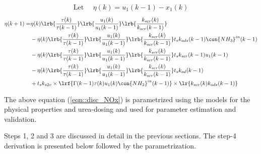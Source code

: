 \begin{enumerate}
\begin{align}
                        \text{Let }\quad \eta(k) = u_1(k-1) - x_1(k)
                \end{align}
\begin{align}
        \eta(k+1) =& \eta(k) \lrb{\frac{\tau(k)}{\tau(k-1)}}
                                \lrb{\frac{u_1(k)}{u_1(k-1)}}
                                \lrb{\frac{k_{scr}(k)}{k_{scr}(k-1)}} \notag \\
                &-\eta(k) \lrb{\frac{\tau(k)}{\tau(k-1)}}
                                \lrb{\frac{u_1(k)}{u_1(k-1)}}
                                \lrb{\frac{k_{scr}(k)}{k_{scr}(k-1)}}
                t_s k_{ads}(k-1) \con{NH_3}^{in}(k-1)
                \notag \\
                &-\eta(k) \lrb{\frac{\tau(k)}{\tau(k-1)}}
                                \lrb{\frac{u_1(k)}{u_1(k-1)}}
                                \lrb{\frac{k_{scr}(k)}{k_{scr}(k-1)}}
                t_s k_{scr}(k-1) u_1(k-1)
                \notag \\
                &-\eta(k) \lrb{\frac{\tau(k)}{\tau(k-1)}}
                                \lrb{\frac{u_1(k)}{u_1(k-1)}}
                                \lrb{\frac{k_{scr}(k)}{k_{scr}(k-1)}}
                t_s k_{od}(k-1)
                \notag \\
                &+ t_s k_{s2v} \times \lrf{\Gamma(k-1) \tau(k) u_1(k) \con{NH_3}^{in}(k-1)} \times \lr{k_{scr}(k) k_{ads}(k-1)}
                \label{eqn::disc_NOx}
\end{align}

\end{enumerate}

The above equation (\ref{eqn::disc_NOx}) is parametrized using the models for the physical properties and
urea-dosing and used for parameter estimation and validation.

Steps 1, 2 and 3 are discussed in detail in the previous sections. The step-4 derivation is presented below followed by the parametrization.






